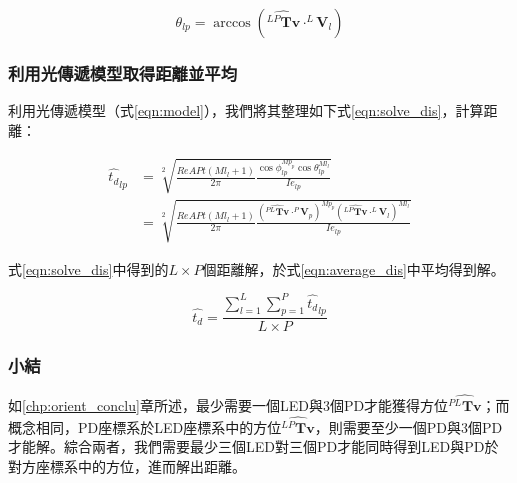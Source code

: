         \begin{equation}
            \label{eqn:solve_outang}
            \theta_{lp} = \arccos(\hat{{^{LP}\boldsymbol{Tv}}}\cdot ^L\boldsymbol{V}_l)
        \end{equation}

        \subsubsection{利用光傳遞模型取得距離並平均}
        \label{chp:dis_average}

        利用光傳遞模型（式\ref{eqn:model}），我們將其整理如下式\ref{eqn:solve_dis}，計算距離：

        \begin{equation}
            \label{eqn:solve_dis}
            \begin{aligned}
            \hat{t_d }_{lp} &= \sqrt[2]{\frac{ReAPt (Ml_{l}+1)}{2\pi}
                \frac{\cos\phi_{lp}^{Mp_{p}}\cos \theta_{lp}^{Ml_{l}} }
                {Ie_{lp}}
            }\\
            & = \sqrt[2]
            {
                \frac{ReAPt (Ml_{l}+1)}{2\pi}
                \frac{
                    (\hat{{^{PL}\boldsymbol{Tv}}}\cdot ^P\boldsymbol{V}_p)^{Mp_{p}}
                    (\hat{{^{LP}\boldsymbol{Tv}}}\cdot ^L\boldsymbol{V}_l)^{Ml_{l}} }
                {Ie_{lp}}
            }
            \end{aligned}
        \end{equation}


        式\ref{eqn:solve_dis}中得到的$L\times P$個距離解，於式\ref{eqn:average_dis}中平均得到解。

        \begin{equation}
            \label{eqn:average_dis}
            \hat{t_d }= \frac{\sum^{L}_{l=1}\sum^{P}_{p=1} \hat{t_d }_{lp} }{L\times P}
        \end{equation}

        \subsubsection{小結}

        如\ref{chp:orient_conclu}章所述，最少需要一個LED與3個PD才能獲得方位$\hat{{^{PL}\boldsymbol{Tv}}}$；而概念相同，PD座標系於LED座標系中的方位$\hat{{^{LP}\boldsymbol{Tv}}}$，則需要至少一個PD與3個PD才能解。綜合兩者，我們需要最少三個LED對三個PD才能同時得到LED與PD於對方座標系中的方位，進而解出距離。


